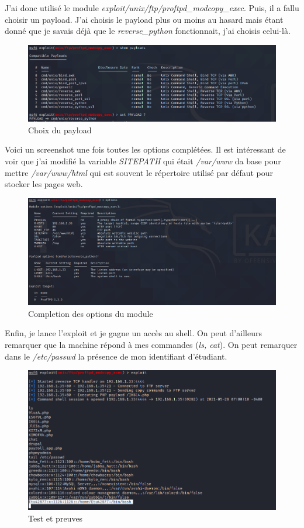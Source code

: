 \documentclass[a4paper]{article}
\begin{document}
J'ai donc utilisé le module \emph{exploit/unix/ftp/proftpd\_modcopy\_exec}. Puis, il a fallu choisir un payload. J'ai choisis le payload plus ou moins au hasard mais étant donné que je savais déjà que le
\emph{reverse\_python} fonctionnait, j'ai choisis celui-là.

\begin{figure}[H]
  \centering
  \includegraphics[width=13cm]{images/Rapport/kali/ubuntu/ftp/2.png}
  \caption{Choix du payload}
\end{figure}

Voici un screenshot une fois toutes les options complétées. Il est intéressant de voir que j'ai modifié la variable \emph{SITEPATH} qui était \emph{/var/www} da base pour mettre \emph{/var/www/html} 
qui est souvent le répertoire utilisé par défaut pour stocker les pages web.

\begin{figure}[H]
  \centering
  \includegraphics[width=14cm]{images/Rapport/kali/ubuntu/ftp/3.png}
  \caption{Completion des options du module}
\end{figure}

Enfin, je lance l'exploit et je gagne un accès au shell. On peut d'ailleurs remarquer que la machine répond à mes commandes (\emph{ls, cat}). On peut remarquer dans le \emph{/etc/passwd} la présence de 
mon identifiant d'étudiant.

\begin{figure}[H]
  \centering
  \includegraphics[width=14cm]{images/Rapport/kali/ubuntu/ftp/4.png}
  \caption{Test et preuves}
\end{figure}
\end{document}
